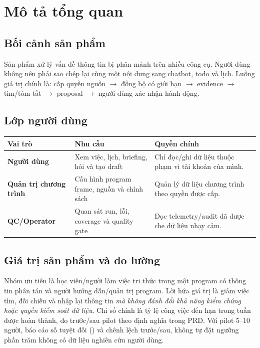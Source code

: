 \documentclass[12pt,a4paper]{article}
\begin{document}
\section{Mô tả tổng quan}
\subsection{Bối cảnh sản phẩm}
Sản phẩm xử lý vấn đề thông tin bị phân mảnh trên nhiều công cụ. Người dùng không nên phải sao chép lại cùng một nội dung sang chatbot, todo và lịch. Luồng giá trị chính là: cấp quyền nguồn $\rightarrow$ đồng bộ có giới hạn $\rightarrow$ evidence $\rightarrow$ tìm/tóm tắt $\rightarrow$ proposal $\rightarrow$ người dùng xác nhận hành động.

\subsection{Lớp người dùng}
\begin{tabularx}{\textwidth}{>{\bfseries}p{2.5cm}p{3.4cm}X}
\toprule Vai trò & Nhu cầu & Quyền chính \\ \midrule
Người dùng & Xem việc, lịch, briefing, hỏi và tạo draft & Chỉ đọc/ghi dữ liệu thuộc phạm vi tài khoản của mình. \\
Quản trị chương trình & Cấu hình program frame, nguồn và chính sách & Quản lý dữ liệu chương trình theo quyền được cấp. \\
QC/\allowbreak Operator & Quan sát run, lỗi, coverage và quality gate & Đọc telemetry/audit đã được che dữ liệu nhạy cảm. \\
\bottomrule
\end{tabularx}

\subsection{Giá trị sản phẩm và đo lường}
Nhóm ưu tiên là học viên/người làm việc tri thức trong một program có thông tin phân tán và người hướng dẫn/quản trị program. Lời hứa giá trị là giảm việc tìm, đối chiếu và nhập lại thông tin \emph{mà không đánh đổi khả năng kiểm chứng hoặc quyền kiểm soát dữ liệu}. Chỉ số chính là tỷ lệ công việc đến hạn trong tuần được hoàn thành, đo trước/sau pilot theo định nghĩa trong PRD. Với pilot 5--10 người, báo cáo số tuyệt đối () và chênh lệch trước/sau, không tự đặt ngưỡng phần trăm không có dữ liệu nghiên cứu người dùng.
\end{document}
